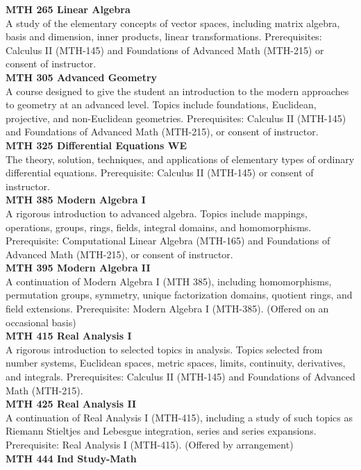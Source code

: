 \documentclass[
  letterpaper,
]{scrbook}
\begin{document}
\textbf{MTH 265 Linear Algebra}\\
A study of the elementary concepts of vector spaces, including matrix
algebra, basis and dimension, inner products, linear transformations.
Prerequisites: Calculus II (MTH-145) and Foundations of Advanced Math
(MTH-215) or consent of instructor.\\
\textbf{MTH 305 Advanced Geometry}\\
A course designed to give the student an introduction to the modern
approaches to geometry at an advanced level. Topics include foundations,
Euclidean, projective, and non-Euclidean geometries. Prerequisites:
Calculus II (MTH-145) and Foundations of Advanced Math (MTH-215), or
consent of instructor.\\
\textbf{MTH 325 Differential Equations WE}\\
The theory, solution, techniques, and applications of elementary types
of ordinary differential equations. Prerequisite: Calculus II (MTH-145)
or consent of instructor.\\
\textbf{MTH 385 Modern Algebra I}\\
A rigorous introduction to advanced algebra. Topics include mappings,
operations, groups, rings, fields, integral domains, and homomorphisms.
Prerequisite: Computational Linear Algebra (MTH-165) and Foundations of
Advanced Math (MTH-215), or consent of instructor.\\
\textbf{MTH 395 Modern Algebra II}\\
A continuation of Modern Algebra I (MTH 385), including homomorphisms,
permutation groups, symmetry, unique factorization domains, quotient
rings, and field extensions. Prerequisite: Modern Algebra I (MTH-385).
(Offered on an occasional basis)\\
\textbf{MTH 415 Real Analysis I}\\
A rigorous introduction to selected topics in analysis. Topics selected
from number systems, Euclidean spaces, metric spaces, limits,
continuity, derivatives, and integrals. Prerequisites: Calculus II
(MTH-145) and Foundations of Advanced Math (MTH-215).\\
\textbf{MTH 425 Real Analysis II}\\
A continuation of Real Analysis I (MTH-415), including a study of such
topics as Riemann Stieltjes and Lebesgue integration, series and series
expansions. Prerequisite: Real Analysis I (MTH-415). (Offered by
arrangement)\\
\textbf{MTH 444 Ind Study-Math}\\
\end{document}
